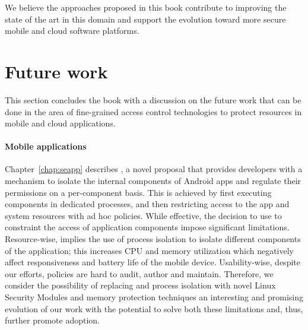 We believe the approaches proposed in this book contribute to
improving the state of the art in this domain and support the
evolution toward more secure mobile and cloud software platforms.

\section{Future work}

This section concludes the book with a discussion on the future work
that can be done in the area of fine-grained access control
technologies to protect resources in mobile and cloud applications.

\paragraph*{Mobile applications} Chapter~\ref{chap:seapp}
describes \seapp, a novel proposal that provides developers with a
mechanism to isolate the internal components of Android apps and
regulate their permissions on a per-component basis. This is
achieved by first executing components in dedicated processes, and
then restricting access to the app and system resources with ad hoc
\sel policies. While effective, the decision to use \sel to constraint
the access of application components impose significant limitations.
Resource-wise, \sel implies the use of process isolation to isolate
different components of the application; this increases CPU and memory
utilization which negatively affect responsiveness and battery life of
the mobile device. Usability-wise, despite our efforts, \sel policies
are hard to audit, author and maintain. Therefore, we consider the
possibility of replacing \sel and process isolation with novel Linux
Security Modules and memory protection techniques an interesting and
promising evolution of our work with the potential to solve both these
limitations and, thus, further promote adoption.

